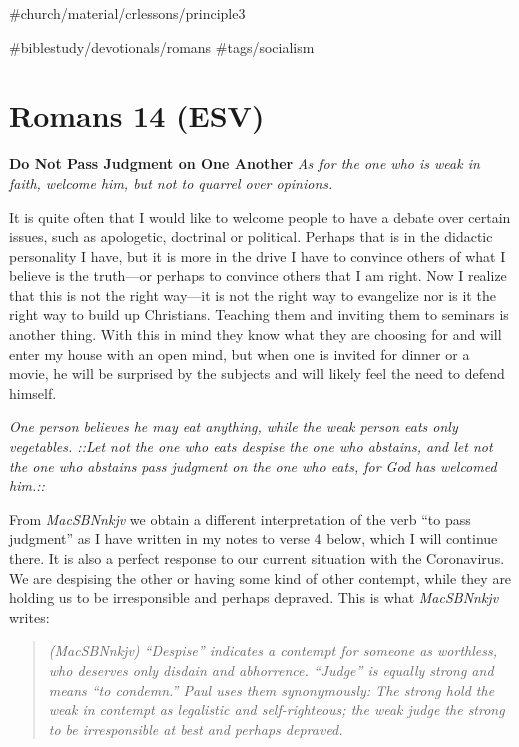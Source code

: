 \#church/material/crlessons/principle3

\#biblestudy/devotionals/romans \#tags/socialism

\hypertarget{romans-14-esv}{%
\section{Romans 14 (ESV)}\label{romans-14-esv}}

\textbf{Do Not Pass Judgment on One Another} \emph{As for the one who is
weak in faith, welcome him, but not to quarrel over opinions.}

It is quite often that I would like to welcome people to have a debate
over certain issues, such as apologetic, doctrinal or political. Perhaps
that is in the didactic personality I have, but it is more in the drive
I have to convince others of what I believe is the truth---or perhaps to
convince others that I am right. Now I realize that this is not the
right way---it is not the right way to evangelize nor is it the right
way to build up Christians. Teaching them and inviting them to seminars
is another thing. With this in mind they know what they are choosing for
and will enter my house with an open mind, but when one is invited for
dinner or a movie, he will be surprised by the subjects and will likely
feel the need to defend himself.

\emph{One person believes he may eat anything, while the weak person
eats only vegetables. ::Let not the one who eats despise the one who
abstains, and let not the one who abstains pass judgment on the one who
eats, for God has welcomed him.::}

From \emph{MacSBNnkjv} we obtain a different interpretation of the verb
``to pass judgment'' as I have written in my notes to verse 4 below,
which I will continue there. It is also a perfect response to our
current situation with the Coronavirus. We are despising the other or
having some kind of other contempt, while they are holding us to be
irresponsible and perhaps depraved. This is what \emph{MacSBNnkjv}
writes:

\begin{quote}
\emph{(MacSBNnkjv) ``Despise'' indicates a contempt for someone as
worthless, who deserves only disdain and abhorrence. ``Judge'' is
equally strong and means ``to condemn.'' Paul uses them synonymously:
The strong hold the weak in contempt as legalistic and self-righteous;
the weak judge the strong to be irresponsible at best and perhaps
depraved.}
\end{quote}

